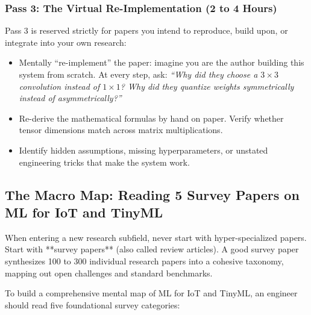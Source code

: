 \subsubsection*{Pass 3: The Virtual Re-Implementation (2 to 4 Hours)}
Pass 3 is reserved strictly for papers you intend to reproduce, build upon, or integrate into your own research:
\begin{itemize}
    \item Mentally ``re-implement'' the paper: imagine you are the author building this system from scratch. At every step, ask: \textit{``Why did they choose a $3 \times 3$ convolution instead of $1 \times 1$? Why did they quantize weights symmetrically instead of asymmetrically?''}
    \item Re-derive the mathematical formulas by hand on paper. Verify whether tensor dimensions match across matrix multiplications.
    \item Identify hidden assumptions, missing hyperparameters, or unstated engineering tricks that make the system work.
\end{itemize}

\subsection{The Macro Map: Reading 5 Survey Papers on ML for IoT and TinyML}

When entering a new research subfield, never start with hyper-specialized papers. Start with **survey papers** (also called review articles). A good survey paper synthesizes 100 to 300 individual research papers into a cohesive taxonomy, mapping out open challenges and standard benchmarks.

To build a comprehensive mental map of ML for IoT and TinyML, an engineer should read five foundational survey categories:

